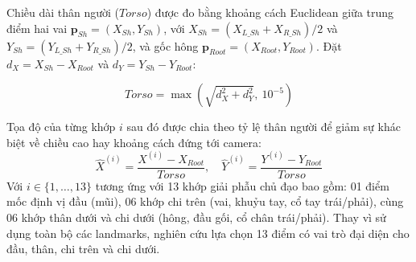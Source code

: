 \documentclass[10pt,conference,a4paper]{IEEEtran}
\begin{document}
Chiều dài thân người ($Torso$) được đo bằng khoảng cách Euclidean giữa trung điểm hai vai $\mathbf{p}_{Sh} = (X_{Sh}, Y_{Sh})$, với $X_{Sh} = (X_{L\_Sh} + X_{R\_Sh})/2$ và $Y_{Sh} = (Y_{L\_Sh} + Y_{R\_Sh})/2$, và gốc hông $\mathbf{p}_{Root} = (X_{Root}, Y_{Root})$. Đặt $d_X = X_{Sh} - X_{Root}$ và $d_Y = Y_{Sh} - Y_{Root}$:

\begin{equation}
Torso = \max\left(\sqrt{d_X^{2} + d_Y^{2}},\ 10^{-5}\right)
\label{eq:torso}
\end{equation}

Tọa độ của từng khớp $i$ sau đó được chia theo tỷ lệ thân người để giảm sự khác biệt về chiều cao hay khoảng cách đứng tới camera:
\begin{equation}
\hat{X}^{(i)} = \frac{X^{(i)} - X_{Root}}{Torso}, \quad \hat{Y}^{(i)} = \frac{Y^{(i)} - Y_{Root}}{Torso}
\end{equation}
Với $i \in \{1, \dots, 13\}$ tương ứng với 13 khớp giải phẫu chủ đạo bao gồm: 01 điểm mốc định vị đầu (mũi), 06 khớp chi trên (vai, khuỷu tay, cổ tay trái/phải), cùng 06 khớp thân dưới và chi dưới (hông, đầu gối, cổ chân trái/phải). Thay vì sử dụng toàn bộ các landmarks, nghiên cứu lựa chọn 13 điểm có vai trò đại diện cho đầu, thân, chi trên và chi dưới.
\end{document}
